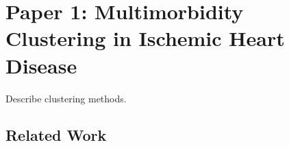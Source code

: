 \chapter{Paper 1: Multimorbidity Clustering in Ischemic Heart Disease}
\label{chap:outline-paper-1}

Describe clustering methods.

\section{Related Work}

